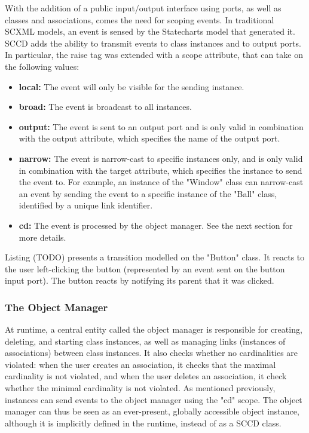 With the addition of a public input/output interface using ports, as well as classes and associations, comes the need for 
scoping events. In traditional SCXML models, an event is sensed by the Statecharts model that generated it. SCCD adds the ability 
to transmit events to class instances and to output ports. In particular, the raise tag was extended with a scope attribute, that 
can take on the following values:
\begin{itemize}
    \item \textbf{local:} The event will only be visible for the sending instance.
    \item \textbf{broad:} The event is broadcast to all instances.
    \item \textbf{output:} The event is sent to an output port and is only valid in combination with the output attribute, which 
    specifies the name of the output port.
    \item \textbf{narrow:} The event is narrow-cast to specific instances only, and is only valid in combination with the target 
    attribute, which specifies the instance to send the event to. For example, an instance of the "Window" class can narrow-cast 
    an event by sending the event to a specific instance of the "Ball" class, identified by a unique link identifier.
    \item \textbf{cd:} The event is processed by the object manager. See the next section for more details.
\end{itemize}
Listing (TODO) presents a transition modelled on the "Button" class. It reacts to the user left-clicking the button (represented 
by an event sent on the button input port). The button reacts by notifying its parent that it was clicked.

\subsubsection{The Object Manager}
At runtime, a central entity called the object manager is responsible for creating, deleting, and starting class instances, as 
well as managing links (instances of associations) between class instances. It also checks whether no cardinalities are violated: 
when the user creates an association, it checks that the maximal cardinality is not violated, and when the user deletes an 
association, it check whether the minimal cardinality is not violated. As mentioned previously, instances can send events to the 
object manager using the "cd" scope. The object manager can thus be seen as an ever-present, globally accessible object instance, 
although it is implicitly defined in the runtime, instead of as a SCCD class.


